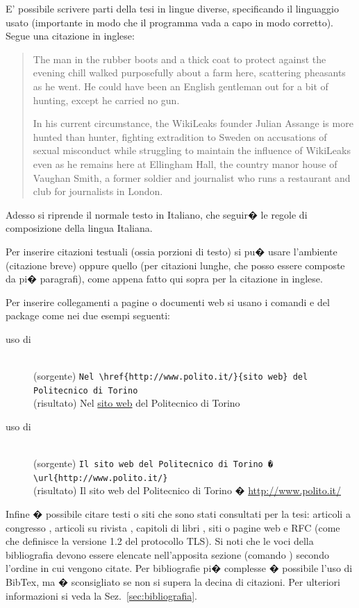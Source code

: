 E' possibile scrivere parti della tesi in lingue diverse, specificando il linguaggio usato (importante in modo che il programma vada a capo in modo corretto). Segue una citazione in inglese:
\begin{quotation}
The man in the rubber boots and a thick coat to protect against the evening chill walked purposefully about a farm here, scattering pheasants as he went. He could have been an English gentleman out for a bit of hunting, except he carried no gun.

In his current circumstance, the WikiLeaks founder Julian Assange is more hunted than hunter, fighting extradition to Sweden on accusations of sexual misconduct while struggling to maintain the influence of WikiLeaks even as he remains here at Ellingham Hall, the country manor house of Vaughan Smith, a former soldier and journalist who runs a restaurant and club for journalists in London. 
\end{quotation}
Adesso si riprende il normale testo in Italiano, che seguir� le regole di composizione della lingua Italiana.

Per inserire citazioni testuali (ossia porzioni di testo) si pu� usare l'ambiente  (citazione breve) oppure quello  (per citazioni lunghe, che posso essere composte da pi� paragrafi), come appena fatto qui sopra per la citazione in inglese.

Per inserire collegamenti a pagine o documenti web si usano i comandi  e  del package  come nei due esempi seguenti:
\begin{description}
\item[uso di ]\mbox{}\\
(sorgente) \verb+Nel \href{http://www.polito.it/}{sito web} del Politecnico di Torino+
\\
(risultato) Nel \href{http://www.polito.it/}{sito web} del Politecnico di Torino
\item[uso di ]\mbox{}\\
(sorgente) \verb+Il sito web del Politecnico di Torino � \url{http://www.polito.it/}+
\\
(risultato) Il sito web del Politecnico di Torino � \url{http://www.polito.it/}
\end{description}

Infine � possibile citare testi o siti che sono stati consultati per la tesi: articoli a congresso \cite{psisec}, articoli su rivista \cite{tpa}, capitoli di libri \cite{tc}, siti o pagine web \cite{openssl} e RFC (come  \cite{tls12} che definisce la versione 1.2 del protocollo TLS).
Si noti che le voci della bibliografia devono essere elencate nell'apposita sezione (comando ) secondo l'ordine in cui vengono citate.
Per bibliografie pi� complesse � possibile l'uso di BibTex, ma � sconsigliato se non si supera la decina di citazioni.
Per ulteriori informazioni si veda la Sez.~\ref{sec:bibliografia}.

